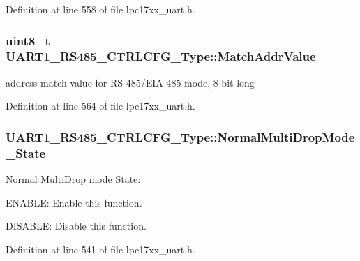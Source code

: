 \-Definition at line 558 of file lpc17xx\-\_\-uart.\-h.

\hypertarget{struct_u_a_r_t1___r_s485___c_t_r_l_c_f_g___type_a56883cdc3cee7c7dab7859f55ae9848e}{
\subsubsection[{\-Match\-Addr\-Value}]{\setlength{\rightskip}{0pt plus 5cm}uint8\-\_\-t {\bf \-U\-A\-R\-T1\-\_\-\-R\-S485\-\_\-\-C\-T\-R\-L\-C\-F\-G\-\_\-\-Type\-::\-Match\-Addr\-Value}}}\label{struct_u_a_r_t1___r_s485___c_t_r_l_c_f_g___type_a56883cdc3cee7c7dab7859f55ae9848e}
address match value for \-R\-S-\/485/\-E\-I\-A-\/485 mode, 8-\/bit long 

\-Definition at line 564 of file lpc17xx\-\_\-uart.\-h.

\hypertarget{struct_u_a_r_t1___r_s485___c_t_r_l_c_f_g___type_aa2f683b91877a1f1e583484352d9eadc}{
\subsubsection[{\-Normal\-Multi\-Drop\-Mode\-\_\-\-State}]{ {\bf \-U\-A\-R\-T1\-\_\-\-R\-S485\-\_\-\-C\-T\-R\-L\-C\-F\-G\-\_\-\-Type\-::\-Normal\-Multi\-Drop\-Mode\-\_\-\-State}}}\label{struct_u_a_r_t1___r_s485___c_t_r_l_c_f_g___type_aa2f683b91877a1f1e583484352d9eadc}
\-Normal \-Multi\-Drop mode \-State\-:
\begin{DoxyItemize}
\item \-E\-N\-A\-B\-L\-E\-: \-Enable this function.
\item \-D\-I\-S\-A\-B\-L\-E\-: \-Disable this function. 
\end{DoxyItemize}

\-Definition at line 541 of file lpc17xx\-\_\-uart.\-h.

